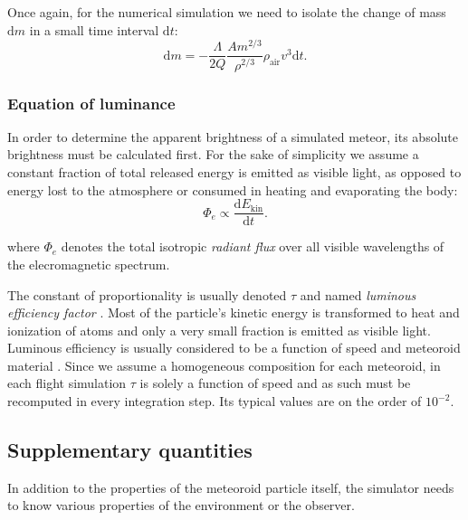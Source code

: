             Once again, for the numerical simulation we need to isolate the change of mass $\mathrm{d}m$
            in a small time interval $\mathrm{d}t$:
            \begin{equation}
                \mathrm{d}m = -\frac{\Lambda}{2Q} \frac{Am^{2/3}}{\rho^{2/3}} \rho_{\mathrm{air}} v^3 \mathrm{d}t\text{.}
                \label{sim:pmf:ea:dm2}
            \end{equation}

        \subsubsection{Equation of luminance} \label{sim:pmf:el}
            In order to determine the apparent brightness of a simulated meteor, its absolute brightness must be calculated first.
            For the sake of simplicity we assume a constant fraction of total released energy is emitted as visible light,
            as opposed to energy lost to the atmosphere or consumed in heating and evaporating the body:
            \begin{equation}
                \Phi_e \propto \frac{\mathrm{d}E_\mathrm{kin}}{\mathrm{d}t}\text{.}
                \label{sim:eq:lum:dekin}
            \end{equation}

            where $\Phi_e$ denotes the total isotropic \emph{radiant flux} over all visible wavelengths of the elecromagnetic spectrum.

            The constant of proportionality is usually denoted $\tau$ and named \emph{luminous efficiency factor} \cite{hill2005}.
            Most of the particle's kinetic energy is transformed
            to heat and ionization of atoms and only a very small fraction is emitted as visible light.
            Luminous efficiency is usually considered to be a function of speed and
            meteoroid material \cite{jones-halliday2001}. Since we assume a homogeneous composition for each meteoroid,
            in each flight simulation $\tau$ is solely a function of speed and as such must be recomputed in every integration step.
            Its typical values are on the order of $10^{-2}$.

    \subsection{Supplementary quantities} \label{s}
        In addition to the properties of the meteoroid particle itself, the simulator needs to know various
        properties of the environment or the observer.

